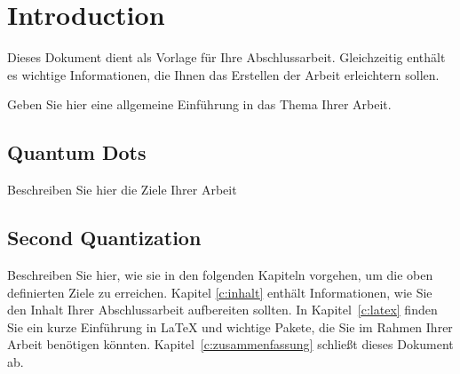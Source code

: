 \chapter{Introduction}
\label{c:introduction}


Dieses Dokument dient als Vorlage für Ihre Abschlussarbeit.
Gleichzeitig enthält es wichtige Informationen, die Ihnen das
Erstellen der Arbeit erleichtern sollen.

Geben Sie hier eine allgemeine Einführung in das Thema Ihrer Arbeit.

\section{Quantum Dots}
Beschreiben Sie hier die Ziele Ihrer Arbeit

\section{Second Quantization}
Beschreiben Sie hier, wie sie in den folgenden Kapiteln
  vorgehen, um die oben definierten Ziele zu erreichen.
Kapitel \ref{c:inhalt} enthält Informationen, wie Sie den Inhalt
Ihrer Abschlussarbeit aufbereiten sollten.
In Kapitel~\ref{c:latex} finden Sie ein kurze Einführung in \LaTeX
und wichtige Pakete, die Sie im Rahmen Ihrer Arbeit benötigen
könnten.
Kapitel~\ref{c:zusammenfassung} schließt dieses Dokument ab.



